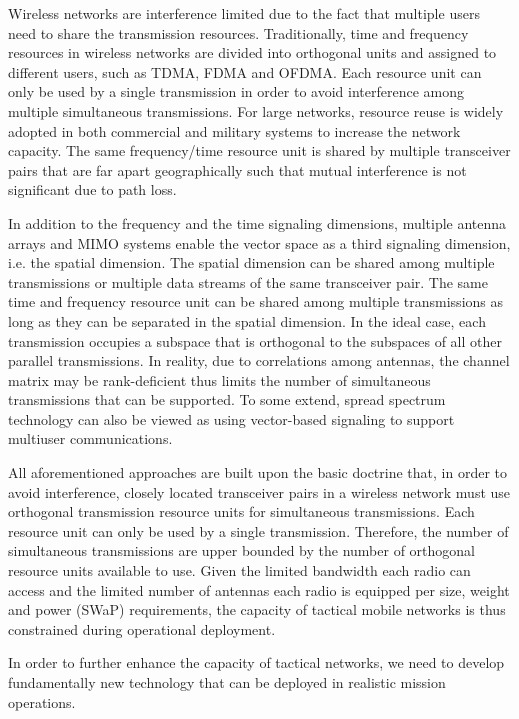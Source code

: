 \documentclass[letterpaper,11pt,onecolumn]{article}
\begin{document}
Wireless networks are interference limited due to the fact that multiple users need to share the transmission resources. Traditionally, time and frequency resources in wireless networks are divided into orthogonal units and assigned to different users, such as TDMA, FDMA and OFDMA. Each resource unit can only be used by a single transmission in order to avoid interference among multiple simultaneous transmissions. For large networks, resource reuse is widely adopted in both commercial and military systems to increase the network capacity. The same frequency/time resource unit is shared by multiple transceiver pairs that are far apart geographically such that mutual interference is not significant due to path loss. 

In addition to the frequency and the time signaling dimensions, multiple antenna arrays and MIMO systems enable the vector space as a third signaling dimension, i.e. the spatial dimension. The spatial dimension can be shared among multiple transmissions or multiple data streams of the same transceiver pair. The same time and frequency resource unit can be shared among multiple transmissions as long as they can be separated in the spatial dimension. In the ideal case, each transmission occupies a subspace that is orthogonal to the subspaces of all other parallel transmissions. In reality, due to correlations among antennas, the channel matrix may be rank-deficient thus limits the number of simultaneous transmissions that can be supported. To some extend, spread spectrum technology can also be viewed as using vector-based signaling to support multiuser communications. 

All aforementioned approaches are built upon the basic doctrine that, in order to avoid interference, closely located transceiver pairs in a wireless network must use orthogonal transmission resource units for simultaneous transmissions. Each resource unit can only be used by a single transmission. Therefore, the number of simultaneous transmissions are upper bounded by the number of orthogonal resource units available to use. Given the limited bandwidth each radio can access and the limited number of antennas each radio is equipped per size, weight and power (SWaP) requirements, the capacity of tactical mobile networks is thus constrained during operational deployment. 

In order to further enhance the capacity of tactical networks, we need to develop fundamentally new technology that can be deployed in realistic mission operations. 
\end{document}
